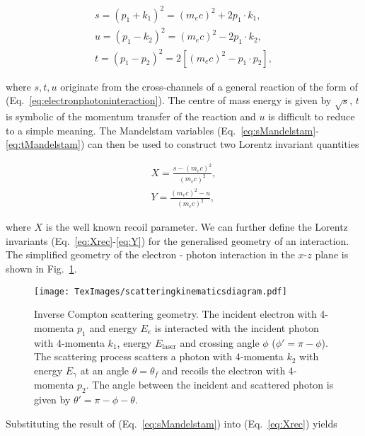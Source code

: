 \documentclass[10pt]{article}
\begin{document}
\begin{align}
s = \left(p_{1}+k_{1}\right)^{2} = \left(m_{e}c\right)^{2}+2p_{1}\cdot k_{1}, 
\label{eq:sMandelstam} \\
u = \left(p_{1}-k_{2}\right)^{2} = \left(m_{e}c\right)^{2}-2p_{1}\cdot k_{2}, 
\label{eq:uMandelstam} \\
t = \left(p_{1}-p_{2}\right)^{2} = 2\left[\left(m_{e}c\right)^{2}-p_{1}\cdot p_{2}\right],
\label{eq:tMandelstam}
\end{align}   

where $s, t, u$ originate from the cross-channels of a general reaction of the form of (Eq.~\ref{eq:electronphotoninteraction}). The centre of mass energy is given by $\sqrt{s}$, $t$ is symbolic of the momentum transfer of the reaction and $u$ is difficult to reduce to a simple meaning. The Mandelstam variables (Eq.~\ref{eq:sMandelstam}-\ref{eq:tMandelstam}) can then be used to construct two Lorentz invariant quantities

\begin{align}
X = \frac{s-\left(m_{e}c\right)^{2}}{\left(m_{e}c\right)^{2}}, 
\label{eq:Xrec} \\
Y = \frac{\left(m_{e}c\right)^{2}-u}{\left(m_{e}c\right)^{2}}, 
\label{eq:Y}
\end{align}

where $X$ is the well known recoil parameter. We can further define the Lorentz invariants (Eq.~\ref{eq:Xrec}-\ref{eq:Y}) for the generalised geometry of an interaction. The simplified geometry of the electron - photon interaction in the $x$-$z$ plane is shown in Fig.~\ref{fig:scatteringdiagram}.

\begin{figure}[H]
\centering
\texttt{[image: TexImages/scatteringkinematicsdiagram.pdf]}
\caption{Inverse Compton scattering geometry. The incident electron with 4-momenta $p_{1}$ and energy $E_{e}$ is interacted with the incident photon with 4-momenta $k_{1}$, energy $E_{\mathrm{laser}}$ and crossing angle $\phi$  ($\phi' = \pi - \phi$). The scattering process scatters a photon with 4-momenta $k_{2}$ with energy $E_{\gamma}$ at an angle $\theta = \theta_{f}$ and recoils the electron with 4-momenta $p_{2}$. The angle between the incident and scattered photon is given by $\theta'=\pi-\phi-\theta$.} 
\label{fig:scatteringdiagram}
\end{figure} 

Substituting the result of (Eq.~\ref{eq:sMandelstam}) into (Eq.~\ref{eq:Xrec}) yields
\end{document}
